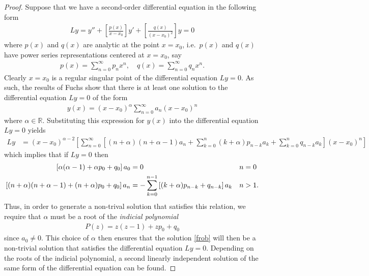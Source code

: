 \documentclass[12pt]{article}
\theoremstyle{definition}
\begin{document}
\begin{proof}
  Suppose that we have a second-order differential equation in the following
  form
  \begin{align}\label{form}
    Ly = y'' + \left[\frac{p(x)}{x-x_0}\right]y' + \left[\frac{q(x)}{(x-x_0)^2}\right]y = 0
  \end{align}
  where $p(x)$ and $q(x)$ are analytic at the point $x=x_0$, i.e.\ $p(x)$ and $q(x)$ have power series representations centered at $x=x_0$, say
  \begin{align*}
    p(x) = \sum_{n=0}^\infty p_n x^n, \quad     q(x) = \sum_{n=0}^\infty q_n x^n.
  \end{align*}
  Clearly $x=x_0$ is a regular singular point of the differential equation $Ly = 0$. As such, the results of Fuchs show that there is at least one solution to the
  differential equation $Ly = 0$ of the form
  \begin{align}\label{frob}
    y(x) = (x-x_0)^\alpha \sum_{n=0}^\infty a_n (x-x_0)^n
  \end{align}
  where $\alpha\in\mathbb{R}$. Substituting this expression for $y(x)$ into the differential equation $Ly=0$ yields
  \begin{align*}
    Ly &= (x-x_0)^{\alpha-2}\left[\sum_{n=0}^\infty\left[(n+\alpha)(n+\alpha-1)a_n + \sum_{k=0}^n(k+\alpha)p_{n-k}a_k + \sum_{k=0}^nq_{n-k}a_k\right](x-x_0)^n \right]
  \end{align*}
  which implies that if $Ly=0$ then
  \begin{align}\label{rel}
    \left[\alpha(\alpha-1)+ \alpha p_{0} + q_{0}\right] a_0&= 0 &n &=0 \notag \\
    \left[(n+\alpha)(n+\alpha-1) + (n+\alpha)p_0 +q_0\right] a_n &= - \sum_{k=0}^{n-1}\left[(k+\alpha)p_{n-k} + q_{n-k}\right]a_k  &n &>1.
  \end{align}
  Thus, in order to generate a non-trival solution that satisfies this relation,
  we require that $\alpha$ must be a root of the \emph{indicial polynomial}
  \begin{align*}
    P(z) = z(z-1)+ z p_{0} + q_{0}
  \end{align*}
  since $a_0 \neq 0$.
  This choice of $\alpha$ then ensures that the solution \eqref{frob} will then be a non-trivial solution that satisfies the differential equation $Ly=0$.
  Depending on the roots of the indicial polynomial, a second linearly independent solution of the same form of the differential equation can be found.


\end{proof}
\end{document}

